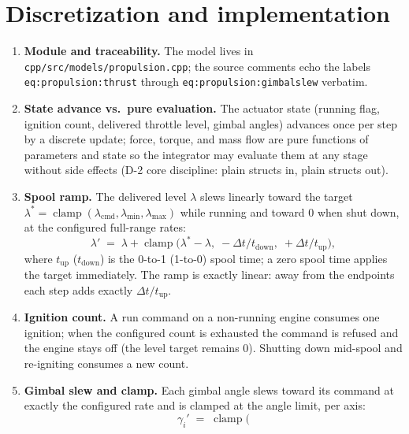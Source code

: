 \section{Discretization and implementation}
\label{sec:propulsion:implementation}

\begin{enumerate}
  \item \textbf{Module and traceability.} The model lives in
    \texttt{cpp/src/models/propulsion.cpp}; the source comments echo
    the labels \texttt{eq:propulsion:thrust} through
    \texttt{eq:propulsion:gimbalslew} verbatim.
  \item \textbf{State advance vs.\ pure evaluation.} The actuator state
    (running flag, ignition count, delivered throttle level, gimbal
    angles) advances once per step by a discrete update; force, torque,
    and mass flow are pure functions of parameters and state so the
    integrator may evaluate them at any stage without side effects
    (D-2 core discipline: plain structs in, plain structs out).
  \item \textbf{Spool ramp.} The delivered level $\lambda$ slews
    linearly toward the target
    $\lambda^\ast = \operatorname{clamp}(\lambda_{\mathrm{cmd}},
    \lambda_{\min}, \lambda_{\max})$ while running and toward $0$ when
    shut down, at the configured full-range rates:
    \begin{equation}
      \lambda' \;=\; \lambda + \operatorname{clamp}\!\bigl(
        \lambda^\ast - \lambda,\;
        -\Delta t / t_{\mathrm{down}},\;
        +\Delta t / t_{\mathrm{up}} \bigr),
      \label{eq:propulsion:spool}
    \end{equation}
    where $t_{\mathrm{up}}$ ($t_{\mathrm{down}}$) is the 0-to-1
    (1-to-0) spool time; a zero spool time applies the target
    immediately. The ramp is exactly linear: away from the endpoints
    each step adds exactly $\Delta t / t_{\mathrm{up}}$.
  \item \textbf{Ignition count.} A run command on a non-running engine
    consumes one ignition; when the configured count is exhausted the
    command is refused and the engine stays off (the level target
    remains $0$). Shutting down mid-spool and re-igniting consumes a
    new count.
  \item \textbf{Gimbal slew and clamp.} Each gimbal angle slews toward
    its command at exactly the configured rate and is clamped at the
    angle limit, per axis:
    \begin{equation}
      \gamma_i' \;=\; \operatorname{clamp}\!\bigl(

\end{equation}
\end{enumerate}
